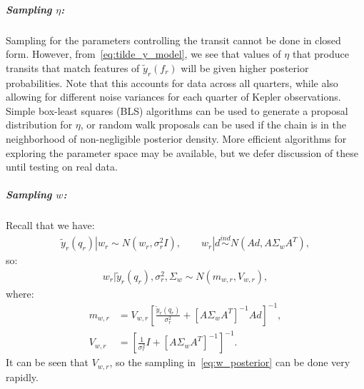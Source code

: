 \documentclass[a4paper,11pt]{article}
\newcommand{\simind}{\stackrel{ind}{\sim}}
\begin{document}
\subparagraph{Sampling $\eta$:} Sampling for the parameters controlling the transit cannot be done in closed form. However, from~\eqref{eq:tilde_y_model}, we see that values of $\eta$ that produce transits that match features of $\tilde{y}_{r}(f_{r})$ will be given higher posterior probabilities. Note that this accounts for data across all quarters, while also allowing for different noise variances for each quarter of Kepler observations. Simple box-least squares (BLS) algorithms can be used to generate a proposal distribution for $\eta$, or random walk proposals can be used if the chain is in the neighborhood of non-negligible posterior density. More efficient algorithms for exploring the parameter space may be available, but we defer discussion of these until testing on real data.  
\subparagraph{Sampling $w$:} Recall that we have:
\begin{align*}
\tilde{y}_{r}(q_{r}) | w_{r}  \sim N\left(w_{r},\sigma_{r}^{2}I\right) , \qquad
w_{r} | d \simind N\left(Ad,A\Sigma_{w}A^{T}\right) ,
\end{align*}
so:
\begin{align}\label{eq:w_posterior}
w_{r} | \tilde{y}_{r}(q_{r}), \sigma^{2}_{r}, \Sigma_{w}  \sim N\left(m_{w,r},V_{w,r}\right) , 
\end{align}
where:
\begin{align*}
 m_{w,r} &= V_{w,r} \left[ \frac{\tilde{y}_{r}(q_{r})}{\sigma^{2}_{r}} + \left[A\Sigma_{w}A^{T}\right]^{-1}Ad\right]^{-1} ,\\
 V_{w,r} &= \left[ \frac{1}{\sigma^{2}_{r}}I + \left[A\Sigma_{w}A^{T}\right]^{-1}\right]^{-1} .
\end{align*}
It can be seen that $V_{w,r}$, so the sampling in~\eqref{eq:w_posterior} can be done very rapidly.
\end{document}
